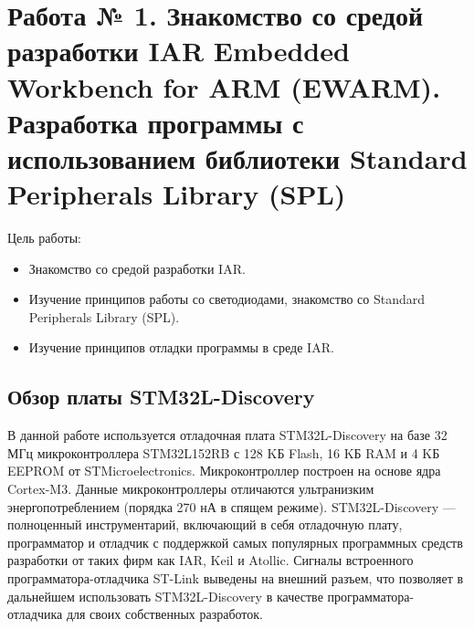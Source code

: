 \chapter{Работа № 1. Знакомство со средой разработки IAR Embedded Workbench for ARM (EWARM). Разработка программы с использованием библиотеки Standard Peripherals Library (SPL)}
Цель работы: 
\begin{itemize}
\item Знакомство со средой разработки IAR.
\item Изучение принципов работы со светодиодами, знакомство со Standard Peripherals Library (SPL).
\item Изучение принципов отладки программы в среде IAR.
\end{itemize}
\section{Обзор платы STM32L-Discovery}
В данной работе используется отладочная плата STM32L-Discovery на базе 32 МГц микроконтроллера STM32L152RB с 128 KБ Flash, 16 KБ RAM и 4 KБ EEPROM от STMicroelectronics.  Микроконтроллер построен на основе ядра Cortex-M3. Данные микроконтроллеры отличаются ультранизким энергопотреблением (порядка 270 нА в спящем режиме). STM32L-Discovery --- полноценный инструментарий, включающий в себя отладочную плату, программатор и отладчик с поддержкой самых популярных программных средств разработки от таких фирм как IAR, Keil и Atollic. Сигналы встроенного программатора-отладчика ST-Link выведены на внешний разъем, что позволяет в дальнейшем использовать STM32L-Discovery в качестве программатора-отладчика для своих собственных разработок.

